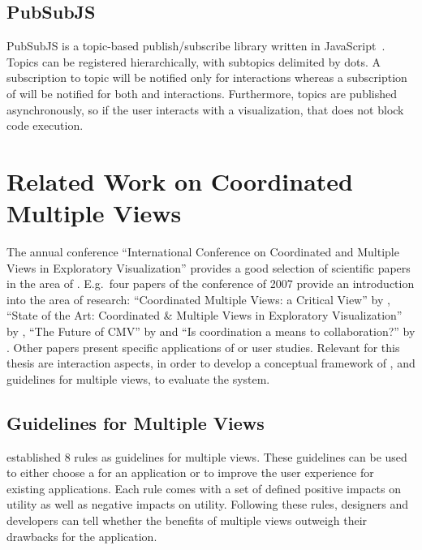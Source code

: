 \subsection{PubSubJS}
PubSubJS is a topic-based publish/subscribe library written in JavaScript~\parencite{PubSubJS2017}.
Topics can be registered hierarchically, with subtopics delimited by dots.
A subscription to topic  will be notified only for  interactions whereas a subscription of  will be notified for both  and  interactions.
Furthermore, topics are published asynchronously, so if the user interacts with a visualization, that does not block code execution.

\section{Related Work on Coordinated Multiple Views}\label{sec:related-work:cmv}
The annual conference ``International Conference on Coordinated and Multiple Views in Exploratory Visualization'' provides a good selection of scientific papers in the area of \cmvs{}.
E.g.\ four papers of the conference of 2007 provide an introduction into the area of research:
``Coordinated Multiple Views: a Critical View'' by \textcite{Andrienko2007},
``State of the Art: Coordinated \& Multiple Views in Exploratory Visualization'' by \textcite{Roberts2007},
``The Future of CMV'' by \textcite{Erbacher2007} and
``Is coordination a means to collaboration?'' by \textcite{Weaver2007}.
Other papers present specific applications of \cmvs{} or user studies.
Relevant for this thesis are interaction aspects, in order to develop a conceptual framework of \cmvs{}, and guidelines for multiple views, to evaluate the system.

\subsection{Guidelines for Multiple Views}\label{sec:related-work:cmv:guidelines}
\textcite{Baldonado2000} established 8 rules as guidelines for multiple views.
These guidelines can be used to either choose a \cmv{} for an application or to improve the user experience for existing \cmv{} applications.
Each rule comes with a set of defined positive impacts on utility as well as negative impacts on utility.
Following these rules, designers and developers can tell whether the benefits of multiple views outweigh their drawbacks for the application.

